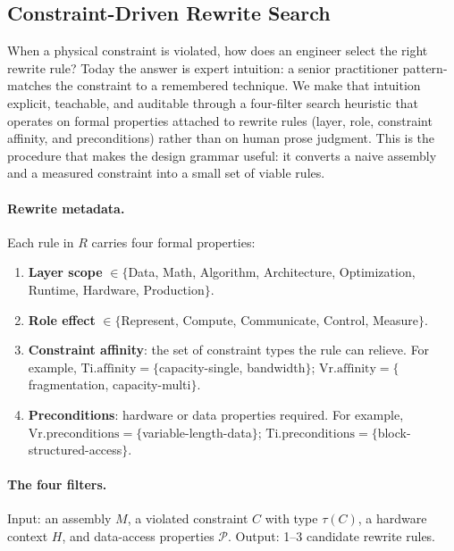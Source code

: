 \documentclass[10pt,twocolumn]{article}
\begin{document}
\subsection{Constraint-Driven Rewrite Search}
\label{sec:resolution}

When a physical constraint is violated, how does an engineer select the right rewrite rule? Today the answer is expert intuition: a senior practitioner pattern-matches the constraint to a remembered technique. We make that intuition explicit, teachable, and auditable through a four-filter search heuristic that operates on formal properties attached to rewrite rules (layer, role, constraint affinity, and preconditions) rather than on human prose judgment. This is the procedure that makes the design grammar useful: it converts a naive assembly and a measured constraint into a small set of viable rules.

\paragraph{Rewrite metadata.} Each rule in $R$ carries four formal properties:

\begin{enumerate}[nosep, leftmargin=*]
\item \textbf{Layer scope} $\in \{$Data, Math, Algorithm, Architecture, Optimization, Runtime, Hardware, Production$\}$.
\item \textbf{Role effect} $\in \{$Represent, Compute, Communicate, Control, Measure$\}$.
\item \textbf{Constraint affinity}: the set of constraint types the rule can relieve. For example, $\text{Ti}.\text{affinity} = \{$capacity-single, bandwidth$\}$; $\text{Vr}.\text{affinity} = \{$fragmentation, capacity-multi$\}$.
\item \textbf{Preconditions}: hardware or data properties required. For example, $\text{Vr}.\text{preconditions} = \{$variable-length-data$\}$; $\text{Ti}.\text{preconditions} = \{$block-structured-access$\}$.
\end{enumerate}

\paragraph{The four filters.} Input: an assembly $M$, a violated constraint $C$ with type $\tau(C)$, a hardware context $H$, and data-access properties $\mathcal{P}$. Output: 1--3 candidate rewrite rules.
\end{document}
